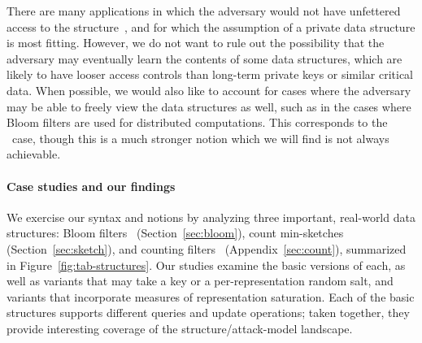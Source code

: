 There are many applications in which the adversary would not have unfettered
access to the structure~\cite{gerbet2015power}, and for which the assumption of
a private data structure is most fitting. However, we do not want to rule out
the possibility that the adversary may eventually learn the contents of some
data structures, which are likely to have looser access controls than long-term
private keys or similar critical data. When possible, we would also like to
account for cases where the adversary may be able to freely view the data
structures as well, such as in the cases where Bloom filters are used for
distributed computations. This corresponds to the \errep\ case, though this is a
much stronger notion which we will find is not always achievable.


\paragraph{Case studies and our findings}
We exercise our syntax and notions by analyzing three important, real-world data
structures: Bloom filters~\cite{bloom1970space} (Section~\ref{sec:bloom}), count
min-sketches~\cite{cormode2005improved} (Section~\ref{sec:sketch}), and counting
filters~\cite{fan2000summary} (Appendix~\ref{sec:count}), summarized in
Figure~\ref{fig:tab-structures}. Our studies examine the basic
versions of each, as well as variants that may take a key or a
per-representation random salt, and variants that incorporate measures
of representation saturation.  Each of the basic structures supports different queries and
update operations; taken together, they provide interesting coverage
of the structure/attack-model landscape.

